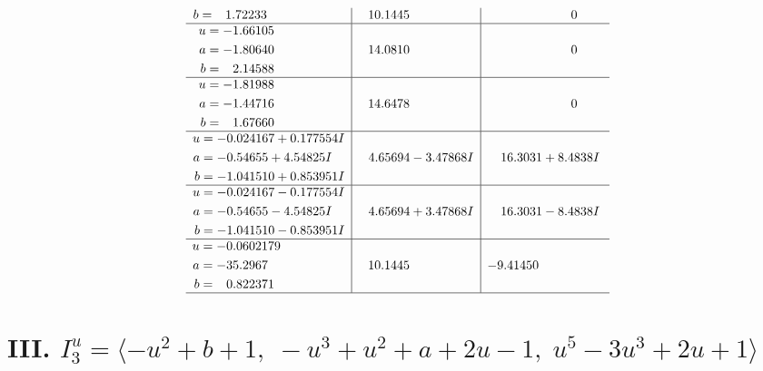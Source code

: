 \documentclass[1p]{elsarticle_modified}
\theoremstyle{definition}
\begin{document}
$$\begin{array}{c|c|c}
\begin{aligned}
b &= \phantom{-}1.72233\phantom{ +0.000000I}\end{aligned}
 & \phantom{-}10.1445\phantom{ +0.000000I} & \phantom{-0.000000 } 0 \\ \hline\begin{aligned}
u &= -1.66105\phantom{ +0.000000I} \\
a &= -1.80640\phantom{ +0.000000I} \\
b &= \phantom{-}2.14588\phantom{ +0.000000I}\end{aligned}
 & \phantom{-}14.0810\phantom{ +0.000000I} & \phantom{-0.000000 } 0 \\ \hline\begin{aligned}
u &= -1.81988\phantom{ +0.000000I} \\
a &= -1.44716\phantom{ +0.000000I} \\
b &= \phantom{-}1.67660\phantom{ +0.000000I}\end{aligned}
 & \phantom{-}14.6478\phantom{ +0.000000I} & \phantom{-0.000000 } 0 \\ \hline\begin{aligned}
u &= -0.024167 + 0.177554 I \\
a &= -0.54655 + 4.54825 I \\
b &= -1.041510 + 0.853951 I\end{aligned}
 & \phantom{-}4.65694 - 3.47868 I & \phantom{-}16.3031 + 8.4838 I \\ \hline\begin{aligned}
u &= -0.024167 - 0.177554 I \\
a &= -0.54655 - 4.54825 I \\
b &= -1.041510 - 0.853951 I\end{aligned}
 & \phantom{-}4.65694 + 3.47868 I & \phantom{-}16.3031 - 8.4838 I \\ \hline\begin{aligned}
u &= -0.0602179\phantom{ +0.000000I} \\
a &= -35.2967\phantom{ +0.000000I} \\
b &= \phantom{-}0.822371\phantom{ +0.000000I}\end{aligned}
 & \phantom{-}10.1445\phantom{ +0.000000I} & -9.41450\phantom{ +0.000000I}\\
 \hline 
 \end{array}$$\newpage\newpage\renewcommand{\arraystretch}{1}
\centering \section*{III. $I^u_{3}= \langle - u^2+b+1,\;- u^3+u^2+a+2 u-1,\;u^5-3 u^3+2 u+1 \rangle$}
\end{document}
